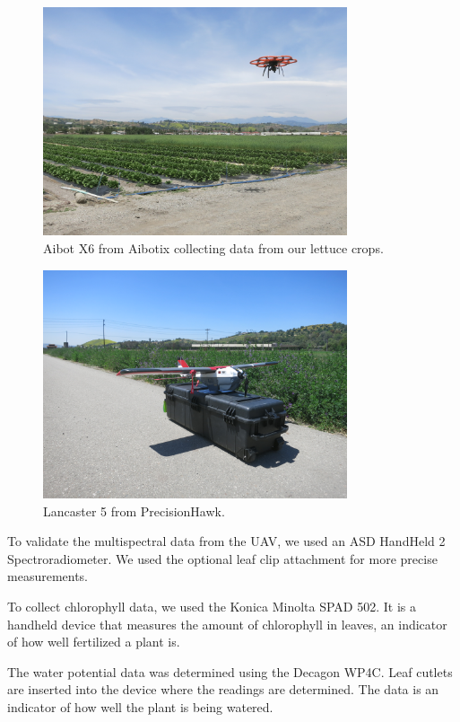 \begin{figure}
    \centering
    \includegraphics[width=0.8\textwidth]{images/aibotx6.JPG}
    \caption{Aibot X6 from Aibotix collecting data from our lettuce crops.}
    \label{aibotx6}
\end{figure}
\begin{figure}
    \centering
    \includegraphics[width=0.8\textwidth]{images/lancaster5.JPG}
    \caption{Lancaster 5 from PrecisionHawk.}
    \label{lancaster5}
\end{figure}

To validate the multispectral data from the UAV, we used an ASD HandHeld 2 Spectroradiometer. We used the optional leaf clip attachment for more precise measurements.

To collect chlorophyll data, we used the Konica Minolta SPAD 502. It is a handheld device that measures the amount of chlorophyll in leaves, an indicator of how well fertilized a plant is.

The water potential data was determined using the Decagon WP4C. Leaf cutlets are inserted into the device where the readings are determined. The data is an indicator of how well the plant is being watered.



